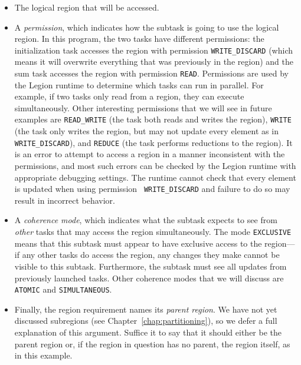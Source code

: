 \begin{itemize}

\item The logical region that will be accessed.

\item A {\em permission}, which indicates how the subtask is going to
  use the logical region.  In this program, the two tasks have
  different permissions: the initialization task accesses the region
  with permission {\tt WRITE\_DISCARD} (which means it will overwrite
  everything that was previously in the region) and the sum task
  accesses the region with permission {\tt READ}.  Permissions are
  used by the Legion runtime to determine which tasks can run in
  parallel.  For example, if two tasks only read from a region, they
  can execute simultaneously.  Other interesting permissions that we
  will see in future examples are {\tt READ\_WRITE} (the task both
  reads and writes the region), {\tt WRITE} (the task only writes the
  region, but may not update every element as in {\tt
    WRITE\_DISCARD}), and {\tt REDUCE} (the task performs reductions
  to the region).  It is an error to attempt to access a region in a
  manner inconsistent with the permissions, and most such errors can be
  checked by the Legion runtime with appropriate debugging settings.
  The runtime cannot check
  that every element is updated when using permission {\tt
    WRITE\_DISCARD} and failure to do so may result in incorrect
  behavior.

\item A {\em coherence mode}, which indicates what the subtask expects to see from {\em other} tasks that may access the
region simultaneously.  The mode {\tt EXCLUSIVE} means that this subtask must appear to have exclusive access to the region---if
any other tasks do access the region, any changes they make cannot be visible to this subtask. Furthermore, the subtask
must see all updates from previously launched tasks. Other coherence modes that we will discuss are {\tt ATOMIC} and
{\tt SIMULTANEOUS}.

\item Finally, the region requirement names its {\em parent region}.
  We have not yet discussed subregions (see
  Chapter~\ref{chap:partitioning}), so we defer a full explanation of
  this argument.  Suffice it to say that it should either be the
  parent region or, if the region in question has no parent, the
  region itself, as in this example.

\end{itemize}

